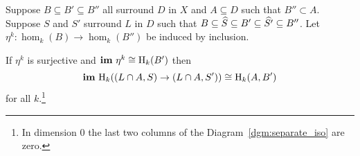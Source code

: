 

\begin{theorem}\label{thm:separate_iso}
  Suppose $B\subseteq B'\subseteq B''$ all surround $D$ in $X$ and $A\subseteq D$ such that $B''\subset A$.
  Suppose $S$ and $S'$ surround $L$ in $D$ such that $B\subseteq \widehat{S} \subseteq B'\subseteq \widehat{S'}\subseteq B''$.
  Let $\eta^k : \hom_k(B)\to \hom_k(B'')$ be induced by inclusion.

  If $\eta^k$ is surjective and $\mathbf{im}~\eta^k\cong \mathrm{H}_k(B')$ then
  \[\mathbf{im}~\mathrm{H}_k((L\cap A, S)\to (L\cap A, S'))\cong \mathrm{H}_k(A, B')\]
  for all $k$.\footnote{In dimension $0$ the last two columns of the Diagram~\ref{dgm:separate_iso} are zero.}
\end{theorem}
